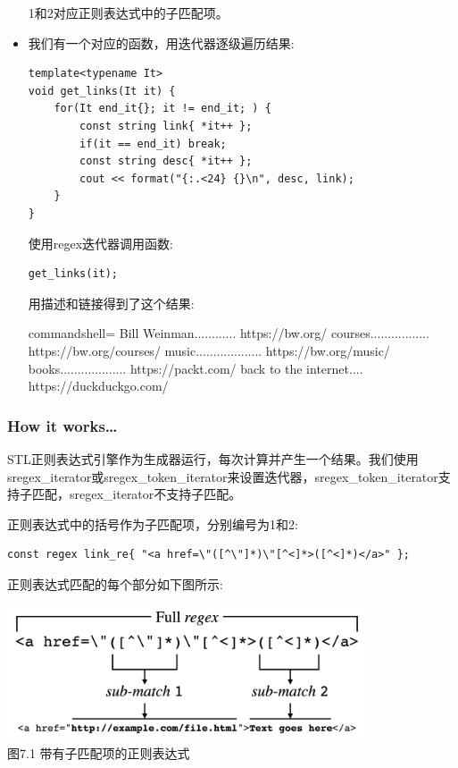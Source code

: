 \begin{itemize}
1和2对应正则表达式中的子匹配项。

\item 
我们有一个对应的函数，用迭代器逐级遍历结果:

\begin{lstlisting}[style=styleCXX]
template<typename It>
void get_links(It it) {
	for(It end_it{}; it != end_it; ) {
		const string link{ *it++ };
		if(it == end_it) break;
		const string desc{ *it++ };
		cout << format("{:.<24} {}\n", desc, link);
	}
}
\end{lstlisting}

使用regex迭代器调用函数:

\begin{lstlisting}[style=styleCXX]
get_links(it);
\end{lstlisting}

用描述和链接得到了这个结果:

\begin{tcblisting}{commandshell={}}
Bill Weinman............ https://bw.org/
courses................. https://bw.org/courses/
music................... https://bw.org/music/
books................... https://packt.com/
back to the internet.... https://duckduckgo.com/
\end{tcblisting}
\end{itemize}

\subsubsection{How it works…}

STL正则表达式引擎作为生成器运行，每次计算并产生一个结果。我们使用sregex\_iterator或sregex\_token\_iterator来设置迭代器，sregex\_token\_iterator支持子匹配，sregex\_iterator不支持子匹配。

正则表达式中的括号作为子匹配项，分别编号为1和2:

\begin{lstlisting}[style=styleCXX]
const regex link_re{ "<a href=\"([^\"]*)\"[^<]*>([^<]*)</a>" };
\end{lstlisting}

正则表达式匹配的每个部分如下图所示:

\begin{center}
\includegraphics[width=0.8\textwidth]{content/chapter7/images/1.png}\\
图7.1 带有子匹配项的正则表达式
\end{center}

